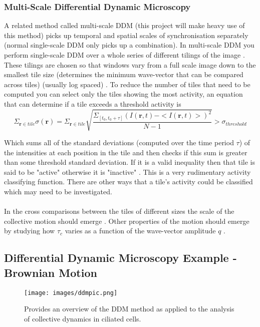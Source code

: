 \documentclass[10pt]{article}
\begin{document}
\subsubsection{Multi-Scale Differential Dynamic Microscopy}
A related method called multi-scale DDM (this project will make heavy use of this method) picks up temporal and spatial scales of synchronisation separately (normal single-scale DDM only picks up a combination).
In multi-scale DDM you perform single-scale DDM over a whole series of different tilings of the image \cite{ddm1}. These tilings are chosen so that windows vary from a full scale image down to the smallest tile size (determines the minimum wave-vector that can be compared across tiles) (usually log spaced) \cite{ddm1}.
To reduce the number of tiles that need to be computed you can select only the tiles showing the most activity, an equation that can determine if a tile exceeds a threshold activity is
\begin{equation}
    \Sigma_{\textbf{r} \in tile} \sigma(\textbf{r}) = \Sigma_{\textbf{r} \in tile} \sqrt{\frac{\Sigma_{[t_0, t_0 + \tau]} (I(\mathbf{r}, t) - <I(\mathbf{r}, t)>)^2}{N - 1}} > \sigma_{threshold}
\end{equation}

Which sums all of the standard deviations (computed over the time period $\tau$) of the intensities at each position in the tile and then checks if this sum is greater than some threshold standard deviation.
If it is a valid inequality then that tile is said to be "active" otherwise it is "inactive" \cite{ddm2}.
This is a very rudimentary activity classifying function.
There are other ways that a tile's activity could be classified which may need to be investigated.
\\\\
In the cross comparisons between the tiles of different sizes the scale of the collective motion should emerge \cite{ddm1}.
Other properties of the motion should emerge by studying how $\tau_c$ varies as a function of the wave-vector amplitude $q$ \cite{ddm1}.

\subsection{Differential Dynamic Microscopy Example - Brownian Motion}

\begin{figure}[H]
\centering
\texttt{[image: images/ddmpic.png]}
\caption{Provides an overview of the DDM method as applied to the analysis of collective dynamics in ciliated cells.\cite{ddm2}}
\end{figure}
\end{document}
